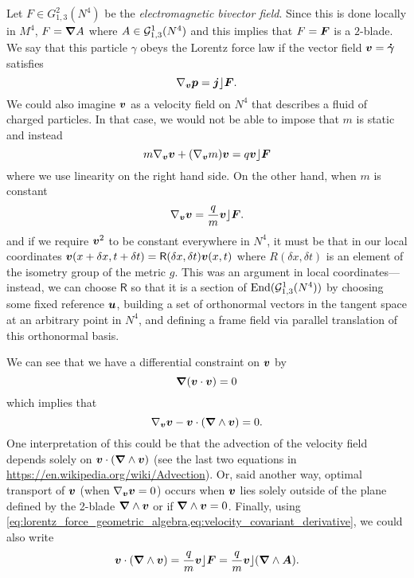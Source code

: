 Let $F\in G_{1,3}^2(N^4)$ be the \emph{electromagnetic bivector field}. Since this is done locally in $M^4$, $F=\boldsymbol{\nabla} A$ where $A\in \mathcal{G}_{1,3}^1(N^4)$ and this implies that $F=\boldsymbol{F}$ is a $2$-blade. We say that this particle $\gamma$ obeys the Lorentz force law if the vector field ${\boldsymbol{v}} = \boldsymbol{\dot{\gamma}}$ satisfies
\begin{equation}
    \label{eq:lorentz_force_geometric_algebra}
    \nabla_{\boldsymbol{v}} \boldsymbol{p} = \boldsymbol{j}\rfloor \boldsymbol{F}.
\end{equation}
We could also imagine ${\boldsymbol{v}}$ as a velocity field on $N^4$ that describes a fluid of charged particles. In that case, we would not be able to impose that $m$ is static and instead
\begin{equation}
    m \nabla_{\boldsymbol{v}} \boldsymbol{v} + (\nabla_{\boldsymbol{v}} m)\boldsymbol{v} = q\boldsymbol{v} \rfloor \boldsymbol{F}
\end{equation}
where we use linearity on the right hand side. On the other hand, when $m$ is constant
\begin{equation}
    \label{eq:lorentz_force_static_mass}
    \nabla_{\boldsymbol{v}} \boldsymbol{v} = \frac{q}{m} \boldsymbol{v} \rfloor \boldsymbol{F}.
\end{equation}
and if we require $\boldsymbol{v}^2$ to be constant everywhere in $N^4$, it must be that in our local coordinates $\boldsymbol{v}(x+\delta x,t + \delta t)=\mathsf{R}(\delta x,\delta t)\boldsymbol{v}(x,t)$ where $R(\delta x,\delta t)$ is an element of the isometry group of the metric $g$. This was an argument in local coordinates---instead, we can choose $\mathsf{R}$ so that it is a section of $\mathrm{End}(\mathcal{G}_{1,3}^1(N^4))$ by choosing some fixed reference ${\boldsymbol{u}}$, building a set of orthonormal vectors in the tangent space at an arbitrary point in $N^4$, and defining a frame field via parallel translation of this orthonormal basis. 

We can see that we have a differential constraint on ${\boldsymbol{v}}$ by
\begin{equation}
    \boldsymbol{\nabla} ({\boldsymbol{v}} \cdot {\boldsymbol{v}}) = 0 
\end{equation}
which implies that
\begin{equation}
    \label{eq:velocity_covariant_derivative}
    \nabla_{\boldsymbol{v}} {\boldsymbol{v}} - {\boldsymbol{v}}\cdot (\boldsymbol{\nabla} \wedge {\boldsymbol{v}}) = 0.
\end{equation}
One interpretation of this could be that the advection of the velocity field depends solely on ${\boldsymbol{v}} \cdot (\boldsymbol{\nabla} \wedge {\boldsymbol{v}})$ (see the last two equations in \url{https://en.wikipedia.org/wiki/Advection}). Or, said another way, optimal transport of ${\boldsymbol{v}}$ (when $\nabla_{\boldsymbol{v}} {\boldsymbol{v}} = 0$) occurs when ${\boldsymbol{v}}$ lies solely outside of the plane defined by the 2-blade $\boldsymbol{\nabla} \wedge {\boldsymbol{v}}$ or if $\boldsymbol{\nabla} \wedge {\boldsymbol{v}} = 0$. Finally, using \cref{eq:lorentz_force_geometric_algebra,eq:velocity_covariant_derivative}, we could also write
\begin{equation}
    {\boldsymbol{v}}\cdot (\boldsymbol{\nabla} \wedge {\boldsymbol{v}}) = \frac{q}{m} {\boldsymbol{v}} \rfloor \boldsymbol{F} = \frac{q}{m} \boldsymbol{v} \rfloor (\boldsymbol{\nabla} \wedge \boldsymbol{A}).
\end{equation}

